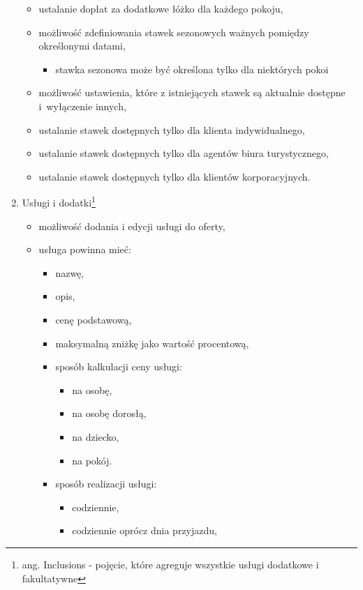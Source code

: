 \documentclass[a4paper,onecolumn,oneside,11pt,wide,floatssmall]{mwrep}
\theoremstyle{definition}
\theoremstyle{plain}%
\theoremstyle{remark}
\begin{document}
\begin{enumerate}
\begin{itemize}
      \item ustalanie dopłat za dodatkowe łóżko dla każdego pokoju,
      \item możliwość zdefiniowania stawek sezonowych ważnych pomiędzy określonymi datami,
        \begin{itemize}
          \item stawka sezonowa może być określona tylko dla niektórych pokoi
        \end{itemize}
      \item możliwość ustawienia, które z istniejących stawek są aktualnie dostępne \mbox{i wyłączenie} innych,
      \item ustalanie stawek dostępnych tylko dla klienta indywidualnego,
      \item ustalanie stawek dostępnych tylko dla agentów biura turystycznego,
      \item ustalanie stawek dostępnych tylko dla klientów korporacyjnych.
    \end{itemize}
  \item Usługi i dodatki\footnote{ang. Inclusions - pojęcie, które agreguje wszystkie usługi dodatkowe i fakultatywne}
    \begin{itemize}
      \item możliwość dodania i edycji usługi do oferty,
      \item usługa powinna mieć:
        \begin{itemize}
          \item nazwę,
          \item opis,
          \item cenę podstawową,
          \item maksymalną zniżkę jako wartość procentową,
          \item sposób kalkulacji ceny usługi:
            \begin{itemize}
              \item na osobę,
              \item na osobę dorosłą,
              \item na dziecko,
              \item na pokój.
            \end{itemize}
          \item sposób realizacji usługi:\label{sposob-realizacji}
            \begin{itemize}
              \item codziennie,
              \item codziennie oprócz dnia przyjazdu,

\end{itemize}
\end{itemize}
\end{itemize}
\end{enumerate}
\end{document}
